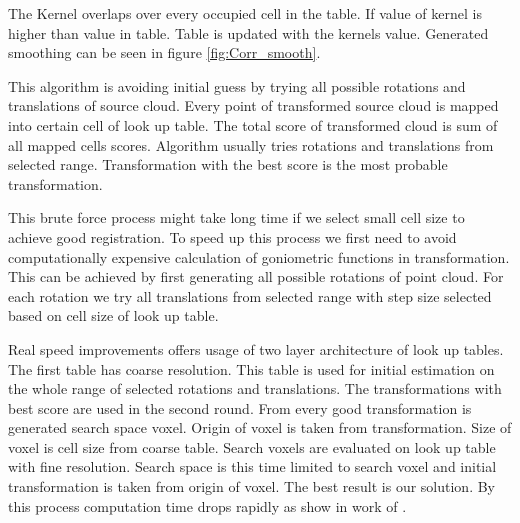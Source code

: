  The Kernel overlaps over every occupied cell in the table. If value of kernel is higher than value in table. Table is updated with the kernels value. Generated smoothing can be seen in figure \ref{fig:Corr_smooth}. 
 
 This algorithm is avoiding initial guess by trying all possible rotations and translations of source cloud. Every point of transformed source cloud is mapped into certain cell of look up table. The total score of transformed cloud is sum of all mapped cells scores. Algorithm usually tries rotations and translations from selected range. Transformation with the best score is the most probable transformation.
 
 This brute force process might take long time if we select small cell size to achieve good registration. To speed up this process we first need to avoid computationally expensive calculation of goniometric functions in transformation. This can be achieved by first generating all possible rotations of point cloud. For each rotation we try all translations from selected range with step size selected based on cell size of look up table.
 
 Real speed improvements offers usage of two layer architecture of look up tables. The first table has coarse resolution. This table is used for initial estimation on the whole range of selected rotations and translations. The transformations with best score are used in the second round. From every good transformation is generated search space voxel. Origin of voxel is taken from transformation. Size of voxel is cell size from coarse table. Search voxels are evaluated on look up table with fine resolution. Search space is this time limited to search voxel and initial transformation is taken from origin of voxel. The best result is our solution. By this process computation time drops rapidly as show in work of \cite{olson2009real}.     
    
\newpage
     

